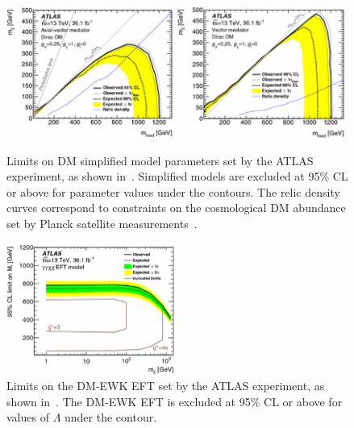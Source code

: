 \documentclass[oneside, letterpaper, 12pt, oldfontcommands]{memoir}
\begin{document}
\begin{figure}[hbtb]
  \begin{center}
    \includegraphics[width=0.49\textwidth]{Figures/dmsimp_atlas_av.png}
    \includegraphics[width=0.49\textwidth]{Figures/dmsimp_atlas_v.png}
    \caption{Limits on DM simplified model parameters set by the ATLAS experiment, as shown in~\cite{ref:epjc/s10052-017-4965-8}. Simplified models are excluded at 95\% CL or above
    for parameter values under the contours. The relic density curves correspond to constraints on the cosmological DM abundance set by Planck satellite measurements~\cite{ref:planck2018_cosparams}.
    }
    \label{fig:dmsimp_atlas}
  \end{center}
\end{figure}

\begin{figure}[hbtb]
  \begin{center}
    \includegraphics[width=0.49\textwidth]{Figures/dmeft_atlas.png}
    \caption{Limits on the DM-EWK EFT set by the ATLAS experiment, as shown in~\cite{ref:epjc/s10052-017-4965-8}. The DM-EWK EFT is excluded at 95\% CL or above for
    values of $\Lambda$ under the contour.
    }
    \label{fig:dmeft_atlas}
  \end{center}
\end{figure}
\end{document}
